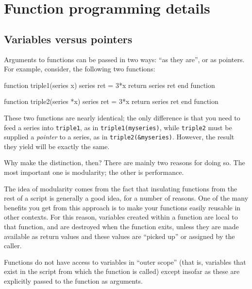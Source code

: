 \section{Function programming details}
\label{func-details}

\subsection{Variables versus pointers}
\label{funscope}

Arguments to functions can be passed in two ways: ``as they are'', or
as pointers. For example, consider, the following two functions:
\begin{code}
function triple1(series x)
  series ret = 3*x
  return series ret
end function
  
function triple2(series *x)
  series ret = 3*x
  return series ret
end function
\end{code}

These two functions are nearly identical; the only difference is that
you need to feed a series into \texttt{triple1}, as in
\texttt{triple1(myseries)}, while \texttt{triple2} must be supplied a
\emph{pointer} to a series, as in
\texttt{triple2(\&myseries)}. However, the result they yield will be
exactly the same.

Why make the distinction, then? There are mainly two reasons for
doing so. The most important one is modularity; the other is performance.

The idea of modularity comes from the fact that insulating functions
from the rest of a script is generally a good idea, for a number of
reasons. One of the many benefits you get from this approach is to
make your functions easily reusable in other contexts.  For this
reason, variables created within a function are local to that
function, and are destroyed when the function exits, unless they are
made available as return values and these values are ``picked up'' or
assigned by the caller.
    
Functions do not have access to variables in ``outer scope'' (that is,
variables that exist in the script from which the function is called)
except insofar as these are explicitly passed to the function as
arguments.  

